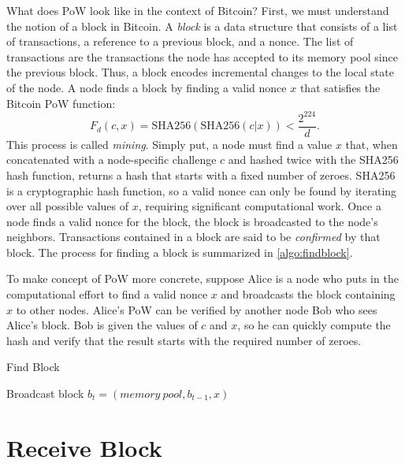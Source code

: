 \documentclass{article}
\begin{document}
What does PoW look like in the context of Bitcoin? First, we must understand the
notion of a block in Bitcoin. A \emph{block} is a data structure that consists
of a list of transactions, a reference to a previous block, and a nonce. The
list of transactions are the transactions the node has accepted to its memory
pool since the previous block. Thus, a block encodes incremental changes to the
local state of the node. A node finds a block by finding a valid nonce $x$ that
satisfies the Bitcoin PoW function:
\[
  F_d(c,x) = \text{SHA256}(\text{SHA256}(c|x)) < \frac{2^{224}}{d}.
\]
This process is called \emph{mining}. Simply put, a node must find a value $x$
that, when concatenated with a node-specific challenge $c$ and hashed twice with
the SHA256 hash function, returns a hash that starts with a fixed number of
zeroes. SHA256 is a cryptographic hash function, so a valid nonce can only be
found by iterating over all possible values of $x$, requiring significant
computational work. Once a node finds a valid nonce for the block, the block is
broadcasted to the node's neighbors. Transactions contained in a block are said
to be \emph{confirmed} by that block. The process for finding a block is
summarized in \cref{algo:findblock}.

To make concept of PoW more concrete, suppose Alice is a node who puts in the
computational effort to find a valid nonce $x$ and broadcasts the block
containing $x$ to other nodes. Alice’s PoW can be verified by another node Bob
who sees Alice’s block. Bob is given the values of $c$ and $x$, so he can
quickly compute the hash and verify that the result starts with the required
number of zeroes.

\begin{algorithm}
  \caption{Find Block}\label{algo:findblock}
  \DontPrintSemicolon%


  Broadcast block $b_t = (memory\ pool, b_{t-1}, x)$\;
\end{algorithm}

\section{Receive Block}
\end{document}
